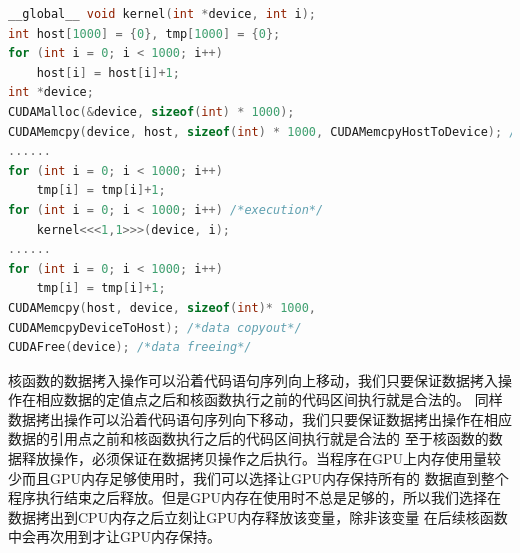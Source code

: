\begin{lstlisting}[label=Listing5,caption=迁移数据拷贝操作,language=C, keywordstyle=\color{blue!70},commentstyle=\color{red!50!green!50!blue!50},frame=shadowbox, rulesepcolor=\color{red!20!green!20!blue!20}] 
__global__ void kernel(int *device, int i);
int host[1000] = {0}, tmp[1000] = {0};
for (int i = 0; i < 1000; i++)
    host[i] = host[i]+1;
int *device;
CUDAMalloc(&device, sizeof(int) * 1000);
CUDAMemcpy(device, host, sizeof(int) * 1000, CUDAMemcpyHostToDevice); /*data copyin*/
......
for (int i = 0; i < 1000; i++)
    tmp[i] = tmp[i]+1;
for (int i = 0; i < 1000; i++) /*execution*/
    kernel<<<1,1>>>(device, i);
......
for (int i = 0; i < 1000; i++)
    tmp[i] = tmp[i]+1;
CUDAMemcpy(host, device, sizeof(int)* 1000,
CUDAMemcpyDeviceToHost); /*data copyout*/
CUDAFree(device); /*data freeing*/
\end{lstlisting}
核函数的数据拷入操作可以沿着代码语句序列向上移动，我们只要保证数据拷入操作在相应数据的定值点之后和核函数执行之前的代码区间执行就是合法的。
同样数据拷出操作可以沿着代码语句序列向下移动，我们只要保证数据拷出操作在相应数据的引用点之前和核函数执行之后的代码区间执行就是合法的
至于核函数的数据释放操作，必须保证在数据拷贝操作之后执行。当程序在GPU上内存使用量较少而且GPU内存足够使用时，我们可以选择让GPU内存保持所有的
数据直到整个程序执行结束之后释放。但是GPU内存在使用时不总是足够的，所以我们选择在数据拷出到CPU内存之后立刻让GPU内存释放该变量，除非该变量
在后续核函数中会再次用到才让GPU内存保持。
